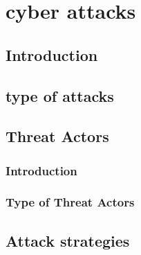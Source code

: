








\section{cyber attacks}
\subsection{Introduction}
\subsection{type of attacks}
\subsection{Threat Actors}
\subsubsection{Introduction}
\subsubsection{Type of Threat Actors}
\subsection{Attack strategies}
